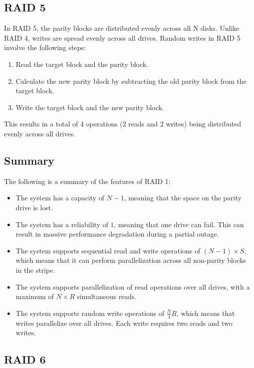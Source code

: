 \subsection{RAID 5}

In RAID 5, the parity blocks are distributed evenly across all N disks. 
Unlike RAID 4, writes are spread evenly across all drives.
Random writes in RAID 5 involve the following steps:
\begin{enumerate}
    \item Read the target block and the parity block.
    \item Calculate the new parity block by subtracting the old parity block from the target block.
    \item Write the target block and the new parity block.
\end{enumerate}
This results in a total of 4 operations (2 reads and 2 writes) being distributed evenly across all drives.

\subsection{Summary}
The following is a summary of the features of RAID 1:
\begin{itemize}
    \item The system has a capacity of $N-1$, meaning that the space on the parity drive is lost. 
    \item The system has a reliability of $1$, meaning that one drive can fail. 
        This can result in massive performance degradation during a partial outage.
    \item The system supports sequential read and write operations of $(N-1)\times S$, which means that it can perform parallelization across all non-parity blocks in the stripe.
    \item The system supports parallelization of read operations over all drives, with a maximum of $N\times R$ simultaneous reads.
    \item The system supports random write operations of $\frac{N}{4}R$, which means that writes parallelize over all drives. 
        Each write requires two reads and two writes. 
\end{itemize}

\subsection{RAID 6}

